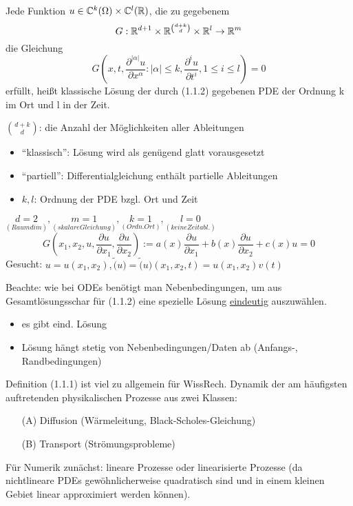 \begin{definition}%
    Jede Funktion $u\in\mathbb{C}^k(\Omega)\times\mathbb{C}^l(\mathbb{R})$, die zu gegebenem 
    \[
        G: \mathbb{R}^{d+1}\times \mathbb{R}^{d+k \choose d}\times\mathbb{R}^l \to \mathbb{R}^m
    \]
     die Gleichung 
     \begin{equation}%
         G\left(x,t, \frac{\partial^{|\alpha|}u}{\partial x^\alpha}: |\alpha| \leq k, \frac{\partial^i u}{\partial t^i}, 1\leq i\leq l\right) = 0
     \end{equation}
     erfüllt, heißt klassische Lösung der durch (1.1.2) gegebenen PDE der Ordnung k im Ort und l in der Zeit.
\end{definition}

$d+k \choose d$: die Anzahl der Möglichkeiten aller Ableitungen

\begin{itemize}
    \item ``klassisch'': Lösung wird als genügend glatt vorausgesetzt
    \item ``partiell'': Differentialgleichung enthält partielle Ableitungen
    \item $k,l$: Ordnung der PDE bzgl. Ort und Zeit
\end{itemize}

\begin{beispiel}
    $\underset{(Raumdim)}{d=2}, \underset{(skalare Gleichung)}{m=1}, \underset{(Ordn. Ort)}{k=1}, \underset{(keine Zeitabl.)}{l=0}$
    \[
        G\left( x_1,x_2,u,\frac{\partial u}{\partial x_1}, \frac{\partial u}{\partial x_2} \right) := a(x) \frac{\partial u}{\partial x_1} + b(x) \frac{ \partial u}{\partial x_2} + c(x) u = 0
    \]
    Gesucht: $u=u(x_1,x_2), \tilde(u) = \tilde(u)(x_1,x_2,t) = u(x_1,x_2)v(t)$
\end{beispiel}

Beachte: wie bei ODEs benötigt man Nebenbedingungen, um aus Gesamtlösungsschar für (1.1.2) eine spezielle Lösung \underline{eindeutig} auszuwählen.

\begin{definition}
\begin{itemize}
    \item es gibt eind. Lösung
    \item Lösung hängt stetig von Nebenbedingungen/Daten ab (Anfangs-, Randbedingungen)
\end{itemize}

Definition (1.1.1) ist viel zu allgemein für WissRech. Dynamik der am häufigsten auftretenden physikalischen Prozesse aus zwei Klassen: 
\begin{enumerate}
    \item[(A)] Diffusion (Wärmeleitung, Black-Scholes-Gleichung)
    \item[(B)] Transport (Strömungsprobleme)
\end{enumerate}
\end{definition}
Für Numerik zunächst: lineare Prozesse oder linearisierte Prozesse (da nichtlineare PDEs gewöhnlicherweise quadratisch sind und in einem kleinen Gebiet linear approximiert werden können).


